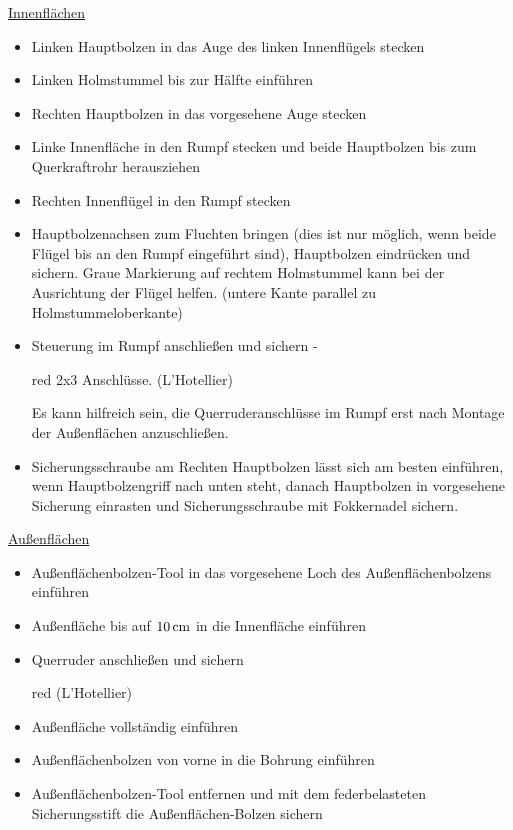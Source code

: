 \underline{Innenflächen}
\begin{itemize}
\item Linken Hauptbolzen in das Auge des linken Innenflügels stecken
\item Linken Holmstummel bis zur Hälfte einführen
\item Rechten Hauptbolzen in das vorgesehene Auge stecken
\item Linke Innenfläche in den Rumpf stecken und beide Hauptbolzen bis zum Querkraftrohr herausziehen
\item Rechten Innenflügel in den Rumpf stecken
\item Hauptbolzenachsen zum Fluchten bringen (dies ist nur mög\-lich, wenn beide Flügel bis an den Rumpf eingeführt sind), Hauptbolzen eindrücken und sichern. Graue Markierung auf rechtem Holmstummel kann bei der Ausrichtung der Flügel helfen. (untere Kante parallel zu Holmstummeloberkante)
\item Steuerung im Rumpf anschließen und sichern - \begin{color}{red} 2x3 Anschlüsse. (L'Hotellier) \end{color} Es kann hilfreich sein, die Querruderanschlüsse im Rumpf erst nach Montage der Außenflächen anzuschließen.
\item Sicherungsschraube am Rechten Hauptbolzen lässt sich am besten einführen, wenn Hauptbolzengriff nach unten steht, danach Hauptbolzen in vorgesehene Sicherung einrasten und Sicherungsschraube mit Fokkernadel sichern.
\end{itemize}

\underline{Außenflächen}
\begin{itemize}
\item Außenflächenbolzen-Tool in das vorgesehene Loch des Außenflächenbolzens einführen
\item Außenfläche bis auf $\unit[10]{cm}$ in die Innenfläche einführen
\item Querruder anschließen und sichern \begin{color}{red} (L'Hotellier) \end{color}
\item Außenfläche vollständig einführen
\item Außenflächenbolzen von vorne in die Bohrung einführen
\item Außenflächenbolzen-Tool entfernen und mit dem federbelasteten Sicherungsstift die Außenflächen-Bolzen sichern 
\end{itemize}

